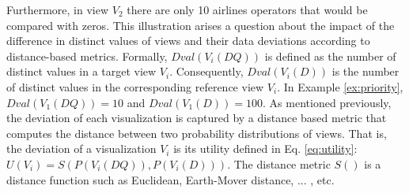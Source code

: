 Furthermore, in view $V_2$ there are only 10 airlines operators that would be compared with zeros.
% 
This illustration arises a question about the impact of the difference in distinct values of views and their data deviations according to distance-based metrics.
%
%
Formally, $Dval(V_i(DQ))$ is defined as the number of distinct values in a target view $V_i$.
%
Consequently, $Dval(V_i(D))$ is the number of distinct values in the corresponding reference view $V_i$.
%
In Example \ref{ex:priority}, $Dval(V_1 (DQ)) = 10$ and $Dval(V_1 (D)) = 100$.
%
As mentioned previously, the deviation of each visualization is captured by a distance based metric that computes the distance between two probability distributions of views.
%
That is, the deviation of a visualization $V_i$ is its utility defined in Eq. \ref{eq:utility}: $U(V_i) = S( P(V_i(DQ)), P(V_i(D)) )$.
%
%
The distance metric $S()$ is a distance function such as Euclidean, Earth-Mover distance, ... , etc.



